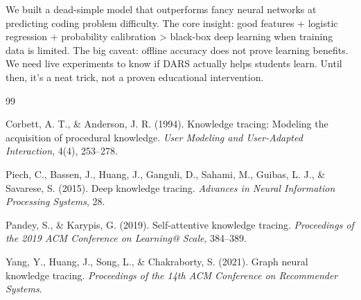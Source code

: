 \documentclass[conference]{IEEEtran}
\begin{document}
We built a dead-simple model that outperforms fancy neural networks at predicting coding problem difficulty. The core insight: good features + logistic regression + probability calibration > black-box deep learning when training data is limited. The big caveat: offline accuracy does not prove learning benefits. We need live experiments to know if DARS actually helps students learn. Until then, it's a neat trick, not a proven educational intervention.

\begin{thebibliography}{99}

Corbett, A. T., \& Anderson, J. R. (1994). Knowledge tracing: Modeling the acquisition of procedural knowledge. \emph{User Modeling and User-Adapted Interaction}, 4(4), 253--278.

Piech, C., Bassen, J., Huang, J., Ganguli, D., Sahami, M., Guibas, L. J., \& Savarese, S. (2015). Deep knowledge tracing. \emph{Advances in Neural Information Processing Systems}, 28.

Pandey, S., \& Karypis, G. (2019). Self-attentive knowledge tracing. \emph{Proceedings of the 2019 ACM Conference on Learning@ Scale}, 384--389.

Yang, Y., Huang, J., Song, L., \& Chakraborty, S. (2021). Graph neural knowledge tracing. \emph{Proceedings of the 14th ACM Conference on Recommender Systems}.

\end{thebibliography}
\end{document}
